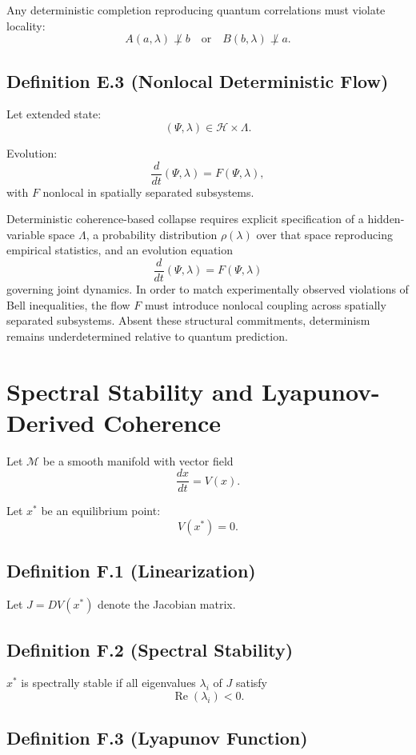 \documentclass[12pt]{article}
\begin{document}
Any deterministic completion reproducing quantum correlations must violate locality:
\[
A(a,\lambda)
\not\perp
b
\quad \text{or} \quad
B(b,\lambda)
\not\perp
a.
\]

\subsection*{Definition E.3 (Nonlocal Deterministic Flow)}

Let extended state:
\[
(\Psi, \lambda) \in \mathcal{H} \times \Lambda.
\]

Evolution:
\[
\frac{d}{dt} (\Psi, \lambda)
=
F(\Psi, \lambda),
\]
with $F$ nonlocal in spatially separated subsystems.

Deterministic coherence-based collapse requires explicit specification of a hidden-variable space $\Lambda$, a probability distribution $\rho(\lambda)$ over that space reproducing empirical statistics, and an evolution equation 
\[
\frac{d}{dt} (\Psi,\lambda) = F(\Psi,\lambda)
\]
governing joint dynamics. In order to match experimentally observed violations of Bell inequalities, the flow $F$ must introduce nonlocal coupling across spatially separated subsystems. Absent these structural commitments, determinism remains underdetermined relative to quantum prediction.

\section{Spectral Stability and Lyapunov-Derived Coherence}

Let $\mathcal{M}$ be a smooth manifold with vector field
\[
\frac{dx}{dt} = V(x).
\]

Let $x^\ast$ be an equilibrium point:
\[
V(x^\ast) = 0.
\]

\subsection*{Definition F.1 (Linearization)}

Let $J = DV(x^\ast)$ denote the Jacobian matrix.

\subsection*{Definition F.2 (Spectral Stability)}

$x^\ast$ is spectrally stable if all eigenvalues $\lambda_i$ of $J$ satisfy
\[
\operatorname{Re}(\lambda_i) < 0.
\]

\subsection*{Definition F.3 (Lyapunov Function)}
\end{document}
